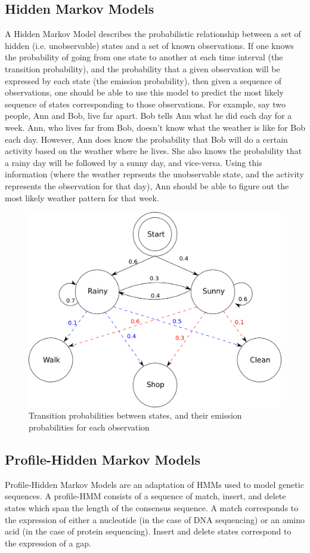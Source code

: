 \documentclass{article}
\begin{document}
\subsection{Hidden Markov Models}
A Hidden Markov Model describes the probabilistic relationship between a set of hidden (i.e. unobservable) states and a set of known observations. If one knows the probability of going from one state to another at each time interval (the transition probability), and the probability that a given observation will be expressed by each state (the emission probability), then given a sequence of observations, one should be able to use this model to predict the most likely sequence of states corresponding to those observations. For example, say two people, Ann and Bob, live far apart. Bob tells Ann what he did each day for a week. Ann, who lives far from Bob, doesn't know what the weather is like for Bob each day. However, Ann does know the probability that Bob will do a certain activity based on the weather where he lives. She also knows the probability that a rainy day will be followed by a sunny day, and vice-versa. Using this information (where the weather reprsents the unobservable state, and the activity represents the observation for that day), Ann should be able to figure out the most likely weather pattern for that week.
\begin{figure}[H]
\centering
\includegraphics[width=.5\textwidth]{materials/HMMGraph.png}
\caption{Transition probabilities between states, and their emission probabilities for each observation\footnotemark[2]}
\end{figure}


\subsection{Profile-Hidden Markov Models}
Profile-Hidden Markov Models are an adaptation of HMMs used to model genetic sequences. A profile-HMM consists of a sequence of match, insert, and delete states which span the length of the consensus sequence. A match corresponds to the expression of either a nucleotide (in the case of DNA sequencing) or an amino acid (in the case of protein sequencing). Insert and delete states correspond to the expression of a gap. 
\end{document}
